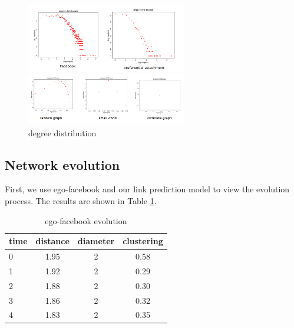 \documentclass[fleqn,10pt]{SelfArx} %
\begin{document}
		\begin{figure}[htbp]
		\centering  
		\subfigure 
		{
			\begin{minipage}{7cm}
				\centering  
				\includegraphics[width=7cm]{figure/degree1.png} 
			\end{minipage}
		}
		\quad
		\subfigure %
		{
			\begin{minipage}{7cm}
				\centering   
				\includegraphics[width=7cm]{figure/degree2.png} 
			\end{minipage}
		}
		\caption{degree distribution}
		\label{dfb}  
	\end{figure}

	\subsection{Network evolution}
	
	First, we use ego-facebook and our link prediction model to view the evolution process. The results are shown in Table \ref{efyh}.
	
	\begin{table}[]
		\centering
		\begin{tabular}{lccc}
			\hline
			time & distance & diameter & clustering\\ \hline
			0 & 1.95    & 2 & 0.58    \\
			1 & 1.92    & 2 & 0.29    \\
			2 & 1.88    & 2 & 0.30    \\
			3 & 1.86    & 2 & 0.32    \\
			4 & 1.83    & 2 & 0.35    \\ \hline
		\end{tabular}
		\caption{ego-facebook evolution}
		\label{efyh}
	\end{table}
	
\end{document}
